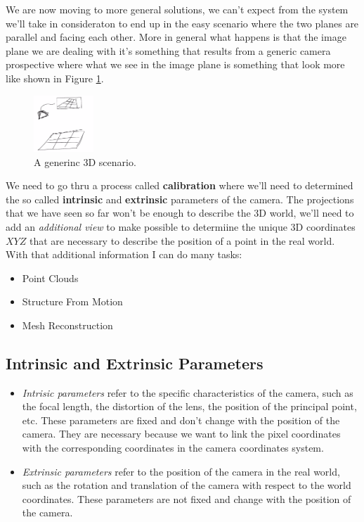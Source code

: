 We are now moving to more general solutions, we can't expect from the system we'll take in consideraton to end up in the easy scenario where the two planes are parallel and facing each other.
More in general what happens is that the image plane we are dealing with it's something that results from a generic camera prospective where what we see in the image plane is something that look more like shown in Figure \ref{fig:3d}.

\begin{figure}[h!]
    \centering
    \includegraphics[width=0.2\textwidth]{Figures/3d.png}
    \caption{A generinc 3D scenario.}
    \label{fig:3d}
\end{figure}

We need to go thru a process called \textbf{calibration} where we'll need to determined the so called \textbf{intrinsic} and \textbf{extrinsic} parameters of the camera. The projections that we have seen so far won't be enough to describe the 3D world, we'll need to add an \textit{additional view} to make possible to determiine the unique 3D coordinates \(X Y Z\) that are necessary to describe the position of a point in the real world. With that additional information I can do many tasks:

\begin{itemize} 
    \item Point Clouds
    \item Structure From Motion
    \item Mesh Reconstruction
\end{itemize}

\subsection{Intrinsic and Extrinsic Parameters}

\begin{itemize} 
    \item\textit{Intrisic parameters} refer to the specific characteristics of the camera, such as the focal length, the distortion of the lens, the position of the principal point, etc. These parameters are fixed and don't change with the position of the camera. They are necessary because we want to link the pixel coordinates with the corresponding coordinates in the camera coordinates system.

    \item\textit{Extrinsic parameters} refer to the position of the camera in the real world, such as the rotation and translation of the camera with respect to the world coordinates. These parameters are not fixed and change with the position of the camera.
\end{itemize}

